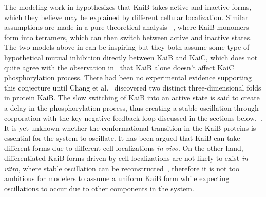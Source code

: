 \documentclass[a4paper,10pt]{article}
\numberwithin{equation}{section}
\begin{document}
The modeling work in \citet{kurosawa2006} hypothesizes that KaiB takes active and inactive forms, which they believe may be explained by different cellular localization.
 Similar assumptions are made in a pure theoretical analysis ~\citet{miyoshi2007}, where KaiB monomers form into tetramers, which can then switch between active and inactive states. The two models above in \citet{kurosawa2006,miyoshi2007}  can be inspiring but they both assume some type of hypothetical mutual inhibition directly between KaiB and KaiC, which does not quite agree with the observation in~ \citet{kitayama2003} that KaiB alone doesn't affect KaiC phosphorylation process. There had been no experimental evidence supporting this conjecture until Chang et al.~\citet{chang324} discovered two distinct three-dimensional folds in protein KaiB. The slow switching of KaiB into an active state is said to create a delay in the phosphorylation process, thus creating a stable oscillation through corporation with the key negative feedback loop discussed in the sections below.~\citet{chang324}. It is yet unknown whether the conformational transition in the KaiB proteins is essential for the system to oscillate. It has been argued that KaiB can take different forms due to different cell localizations \textit{in vivo}. On the other hand, differentiated KaiB forms driven by cell localizations are not likely to exist \textit{in vitro}, where stable oscillation can be reconstructed~\citet{nakajima2005}, therefore it is not too ambitious for modelers to assume a uniform KaiB form while expecting oscillations to occur due to other components in the system.
 



\end{document}
